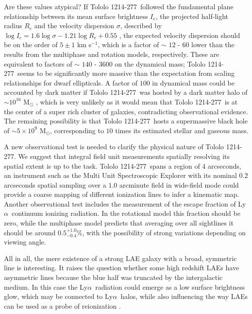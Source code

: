 \documentclass[a4paper, usenatbib, 12pt]{article}
\newcommand{\tol}{Tololo 1214-277}
\newcommand{\lya}{Ly$\alpha$}
\newcommand{\kms}{km s$^{-1}$}
\begin{document}
{Are these values atypical? If \tol\ followed the fundamental
plane relationship between its mean surface brightness
$I_e$, the projected half-light radius $R_e$ and the velocity dispersion
$\sigma$, described by $\log I_e=1.6 \log\sigma - 1.21\log R_e +
0.55$ \cite{2009ApJ...698.1590G},  the expected velocity dispersion
should be on the order of $5 \pm 1$ 
\kms, which is a factor of $\sim$ $12$ - $60$ lower than the 
results from the multiphase and rotation models, respectively. 
These are equivalent to factors of $\sim$ $140$ - $3600$ on the
dynamical mass;
\tol\ seems to be significantly more massive than the expectation from
scaling relationships for dwarf ellipticals.
A factor of $100$ in dynamical mass could be accounted by dark matter if
\tol\ was hosted by a dark matter halo of  $\sim 10^{16}$ M$_{\odot}$
\cite{2011ApJ...726..108T}, which is very unlikely as it would mean that
\tol\ is at the center of a super rich cluster of galaxies,
contradicting observational evidence.
The remaining possibility is that \tol\ hosts a supermassive black hole of
$\sim 5\times 10^{9}$ M$_{\odot}$, corresponding to $10$ times its
estimated stellar and gaseous mass.


A new observational test is needed to clarify the physical nature of
\tol. 
We suggest that integral field unit measurements spatially
resolving its spatial extent is up to the task. 
\tol\ spans a region of $4$ arcseconds,
an instrument such as the Multi Unit Spectroscopic Explorer
\cite{2014Msngr.157...13B} with its
nominal $0.2$ arcseconds spatial sampling over a $1.0$ arcminute field
in wide-field mode could provide a coarse mapping of different
ionization lines to infer a kinematic map.
Another observational test includes the measurement of the escape
fraction of \lya\ continuum ionizing radiation. 
In the rotational model this fraction should be zero, while
the multiphase model predicts that averaging over all sightlines
it should be around $0.5^{+1.0}_{-0.4}$\%, with the possibility of strong
variations depending on viewing angle. 

All in all, the mere existence of a strong LAE galaxy with a broad,
symmetric line is interesting.
It raises the question whether some high redshift LAEs have asymmetric
lines because the blue half was truncated by the intergalactic medium.
In this case the \lya\ radiation could emerge as a low surface
brightness glow, which may be connected to \lya\ halos, while also
influencing the way LAEs can be used as a probe of reionization
\cite{2014PASA...31...40D}.  

}
\end{document}
